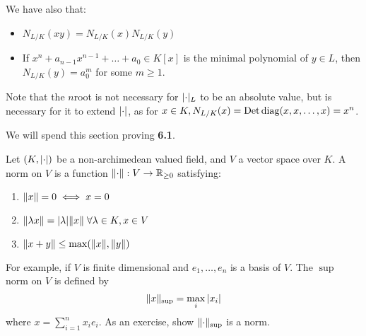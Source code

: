 \documentclass[10pt,a4paper]{article}
\begin{document}
We have also that:
\begin{itemize}
  \item $N_{L/K}(xy) = N_{L/K}(x)N_{L/K}(y)$
  \item If $x^n+a_{n-1}x^{n-1} + \ldots + a_0 \in K[x]$ is the minimal polynomial of $y \in L$, then $N_{L/K}(y) = a_0^m$ for some $m \geq 1$.
\end{itemize}

Note that the $n$\th root is not necessary for $\lvert\cdot\rvert_L$ to be an absolute value, but is necessary for it to extend $\lvert\cdot\rvert$, as for $x \in K, N_{L/K}(x) = \operatorname{Det} \operatorname{diag}(x, x, \ldots, x) = x^n$.

We will spend this section proving \textbf{6.1}.

\begin{definition}
  Let $(K, \lvert\cdot\rvert)$ be a non-archimedean valued field, and $V$ a vector space over $K$. A norm on $V$ is a function $\lVert\cdot\rVert : V \to \mathbb{R}_{\geq 0}$ satisfying:
  \begin{enumerate}
    \item $\lVert x\rVert = 0 \iff x = 0$
    \item $\norm{\lambda x} = \abs\lambda\norm{x}\forall \lambda \in K, x \in V$
    \item $\lVert x+y\rVert\leq \max(\lVert x\rVert, \lVert y\rVert)$
  \end{enumerate}
\end{definition}

For example, if $V$ is finite dimensional and $e_1, \ldots, e_n$ is a basis of $V$. The $\sup$ norm on $V$ is defined by
\[\lVert x\rVert_{\sup} = \max_i |x_i|\]
where $x = \sum_{i=1}^n x_i e_i$. As an exercise, show $\lVert\cdot\rVert_{\sup}$ is a norm.
\end{document}
